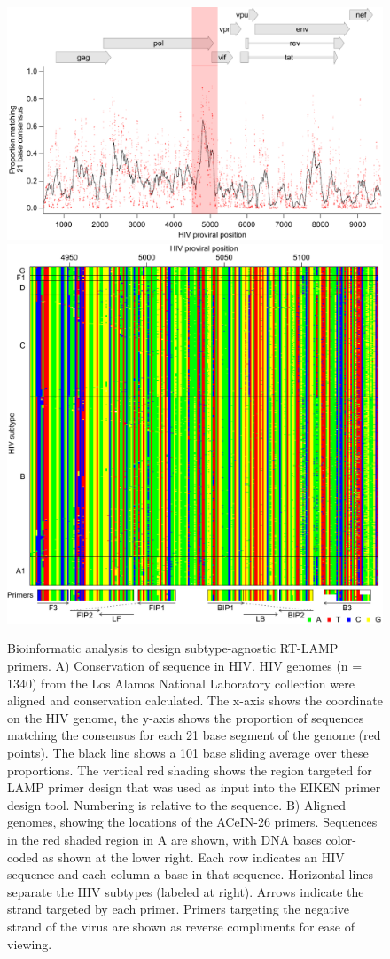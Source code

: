 \documentclass[../sherrill-Mix_thesis.tex]{subfiles}
\begin{document}
			\begin{figure}
			\centering
				\includegraphics[width=.75\textwidth]{consensus.pdf} %
				\includegraphics[width=.75\textwidth]{bases.pdf} %
			\caption[Bioinformatic analysis to design subtype-agnostic RT-LAMP primers]{Bioinformatic analysis to design subtype-agnostic RT-LAMP primers. A) Conservation of sequence in HIV. HIV genomes (n = 1340) from the Los Alamos National Laboratory collection were aligned and conservation calculated. The x-axis shows the coordinate on the HIV genome, the y-axis shows the proportion of sequences matching the consensus for each 21 base segment of the genome (red points). The black line shows a 101 base sliding average over these proportions. The vertical red shading shows the region targeted for LAMP primer design that was used as input into the EIKEN primer design tool. Numbering is relative to the \hivEight{} sequence. B) Aligned genomes, showing the locations of the ACeIN-26 primers. Sequences in the red shaded region in A are shown, with DNA bases color-coded as shown at the lower right. Each row indicates an HIV sequence and each column a base in that sequence. Horizontal lines separate the HIV subtypes (labeled at right). Arrows indicate the strand targeted by each primer. Primers targeting the negative strand of the virus are shown as reverse compliments for ease of viewing.}
			\label{figConsensus}
			\end{figure}
\end{document}
